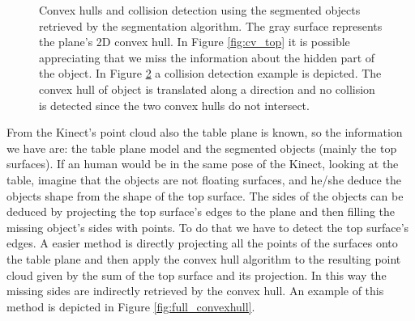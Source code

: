 \begin{figure}[tb]
\begin{subfigure}[t]{0.3\textwidth}
\caption{}\label{fig:cv_top_collision}
\end{subfigure}
\caption{Convex hulls and collision detection using the segmented objects retrieved by the  segmentation algorithm. The gray surface represents the plane's 2D convex hull. In Figure \ref{fig:cv_top} it is possible appreciating that we miss the information about the hidden part of the object. In Figure \ref{fig:cv_top_collision} a collision detection example is depicted. The convex hull of object  is translated along a direction and no collision is detected  since the two convex hulls do not intersect.}
\end{figure}

From the Kinect's point cloud also the table plane is known, so the information we have are: the table plane model and the segmented objects (mainly the top surfaces).
If an human would be in the same pose of the Kinect, looking at the table,   imagine that the objects are not floating surfaces, and he/she  deduce the objects shape from the shape of the top surface. The sides of the objects can be deduced by projecting the top surface's edges to the plane and then filling the missing object's sides with points. To do that we have to detect the top surface's edges. A easier method is directly projecting all the points of the surfaces onto the table plane and then apply the convex hull algorithm to the resulting point cloud given by the sum of the top surface and its projection. In this way the missing sides are indirectly retrieved by the convex hull. An example of this method is depicted in Figure \ref{fig:full_convexhull}.

